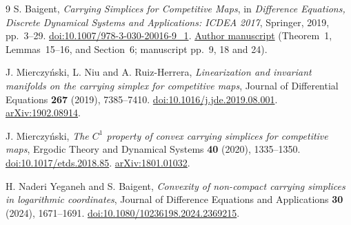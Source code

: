 \documentclass[11pt]{article}
\begin{document}
\begin{thebibliography}{9}
S. Baigent, \emph{Carrying Simplices for Competitive Maps}, in
\emph{Difference Equations, Discrete Dynamical Systems and Applications:
ICDEA 2017}, Springer, 2019, pp.\ 3--29.
\href{https://doi.org/10.1007/978-3-030-20016-9_1}{doi:10.1007/978-3-030-20016-9\_1}.
\href{https://homepages.ucl.ac.uk/~ucess29/resources/ICDEA_RPS.pdf}{Author manuscript}
(Theorem~1, Lemmas~15--16, and Section~6; manuscript pp.\ 9, 18 and 24).

J. Mierczy\'nski, L. Niu and A. Ruiz-Herrera,
\emph{Linearization and invariant manifolds on the carrying simplex for
competitive maps}, Journal of Differential Equations \textbf{267} (2019),
7385--7410.
\href{https://doi.org/10.1016/j.jde.2019.08.001}{doi:10.1016/j.jde.2019.08.001}.
\href{https://arxiv.org/abs/1902.08914v2}{arXiv:1902.08914}.

J. Mierczy\'nski, \emph{The $C^1$ property of convex carrying simplices
for competitive maps}, Ergodic Theory and Dynamical Systems
\textbf{40} (2020), 1335--1350.
\href{https://doi.org/10.1017/etds.2018.85}{doi:10.1017/etds.2018.85}.
\href{https://arxiv.org/abs/1801.01032v2}{arXiv:1801.01032}.

H. Naderi Yeganeh and S. Baigent,
\emph{Convexity of non-compact carrying simplices in logarithmic coordinates},
Journal of Difference Equations and Applications \textbf{30} (2024),
1671--1691.
\href{https://doi.org/10.1080/10236198.2024.2369215}{doi:10.1080/10236198.2024.2369215}.
\end{thebibliography}
\end{document}

